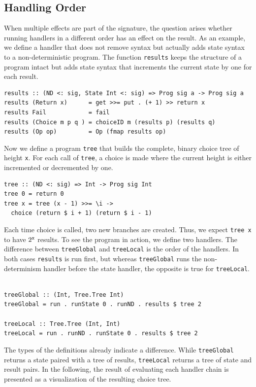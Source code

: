 \documentclass[a4paper, 11pt, fleqn, twoside]{scrreprt}
\newcommand{\hinl}[1]{\texttt{#1}}
\begin{document}
\subsection{Handling Order}
When multiple effects are part of the signature, the question arises whether running handlers in a different order has an effect on the result.
As an example, we define a handler that does not remove syntax but actually adds state syntax to a non-deterministic program.
The function \hinl{results} keeps the structure of a program intact but adds state syntax that increments the current state by one for each result.

\begin{verbatim}
results :: (ND <: sig, State Int <: sig) => Prog sig a -> Prog sig a
results (Return x)      = get >>= put . (+ 1) >> return x
results Fail            = fail
results (Choice m p q ) = choiceID m (results p) (results q)
results (Op op)         = Op (fmap results op)
\end{verbatim}

Now we define a program \hinl{tree} that builds the complete, binary choice tree of height \hinl{x}.
For each call of \hinl{tree}, a choice is made where the current height is either incremented or decremented by one.

\begin{verbatim}
tree :: (ND <: sig) => Int -> Prog sig Int
tree 0 = return 0
tree x = tree (x - 1) >>= \i -> 
  choice (return $ i + 1) (return $ i - 1)
\end{verbatim}

Each time choice is called, two new branches are created.
Thus, we expect \hinl{tree x} to have $2^\text{\hinl{x}}$ results.
To see the program in action, we define two handlers.
The difference between \hinl{treeGlobal} and \hinl{treeLocal} is the order of the handlers.
In both cases \hinl{results} is run first, but whereas \hinl{treeGlobal} runs the non-determinism handler before the state handler, the opposite is true for \hinl{treeLocal}.

\begin{verbatim}

treeGlobal :: (Int, Tree.Tree Int)
treeGlobal = run . runState 0 . runND . results $ tree 2

treeLocal :: Tree.Tree (Int, Int)
treeLocal = run . runND . runState 0 . results $ tree 2
\end{verbatim}

The types of the definitions already indicate a difference.
While \hinl{treeGlobal} returns a state paired with a tree of results, \hinl{treeLocal} returns a tree of state and result pairs.
In the following, the result of evaluating each handler chain is presented as a visualization of the resulting choice tree.
\end{document}
